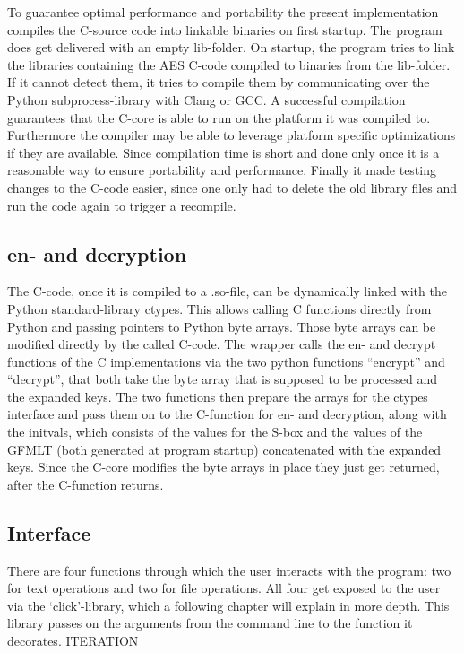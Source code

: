 To guarantee optimal performance and portability the present
implementation compiles the C-source code into linkable binaries on
first startup. The program does get delivered with an empty lib-folder.
On startup, the program tries to link the libraries containing the AES
C-code compiled to binaries from the lib-folder. If it cannot detect
them, it tries to compile them by communicating over the Python
subprocess-library with Clang or GCC. A successful compilation
guarantees that the C-core is able to run on the platform it was
compiled to. Furthermore the compiler may be able to leverage platform
specific optimizations if they are available. Since compilation time is
short and done only once it is a reasonable way to ensure portability
and performance. Finally it made testing changes to the C-code easier,
since one only had to delete the old library files and run the code
again to trigger a recompile.

\hypertarget{en--and-decryption}{%
\subsection{en- and decryption}\label{en--and-decryption}}

The C-code, once it is compiled to a .so-file, can be dynamically linked
with the Python standard-library ctypes. This allows calling C functions
directly from Python and passing pointers to Python byte arrays. Those
byte arrays can be modified directly by the called C-code. The wrapper
calls the en- and decrypt functions of the C implementations via the two
python functions ``encrypt'' and ``decrypt'', that both take the byte
array that is supposed to be processed and the expanded keys. The two
functions then prepare the arrays for the ctypes interface and pass them
on to the C-function for en- and decryption, along with the initvals,
which consists of the values for the S-box and the values of the GFMLT
(both generated at program startup) concatenated with the expanded keys.
Since the C-core modifies the byte arrays in place they just get
returned, after the C-function returns.

\hypertarget{interface}{%
\subsection{Interface}\label{interface}}

There are four functions through which the user interacts with the
program: two for text operations and two for file operations. All four
get exposed to the user via the `click'-library, which a following
chapter will explain in more depth. This library passes on the arguments
from the command line to the function it decorates. ITERATION

